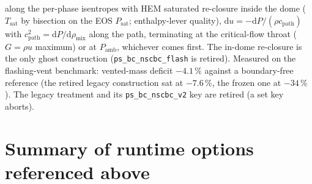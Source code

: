 \documentclass[11pt,a4paper]{article}
\newcommand{\code}[1]{\texttt{\small #1}}
\begin{document}
along the per-phase isentropes with HEM saturated re-closure inside the
dome ($T_{\mathrm{sat}}$ by bisection on the EOS $P_{\mathrm{sat}}$;
enthalpy-lever quality), $\mathrm{d}u = -\mathrm{d}P/(\rho c_{\mathrm{path}})$
with $c_{\mathrm{path}}^2 = \mathrm{d}P/\mathrm{d}\rho_{\mathrm{mix}}$
along the path, terminating at the critical-flow throat ($G=\rho u$
maximum) or at $P_{\mathrm{amb}}$, whichever comes first.
The in-dome re-closure is the only ghost construction
(\code{ps\_bc\_nscbc\_flash} is retired).  Measured on the flashing-vent benchmark: vented-mass deficit
$-4.1\,\%$ against a boundary-free reference (the retired legacy
construction sat at $-7.6\,\%$, the frozen one at $-34\,\%$).  The legacy
treatment and its \code{ps\_bc\_nscbc\_v2} key are retired (a set key
aborts).

\section*{Summary of runtime options referenced above}
\end{document}
